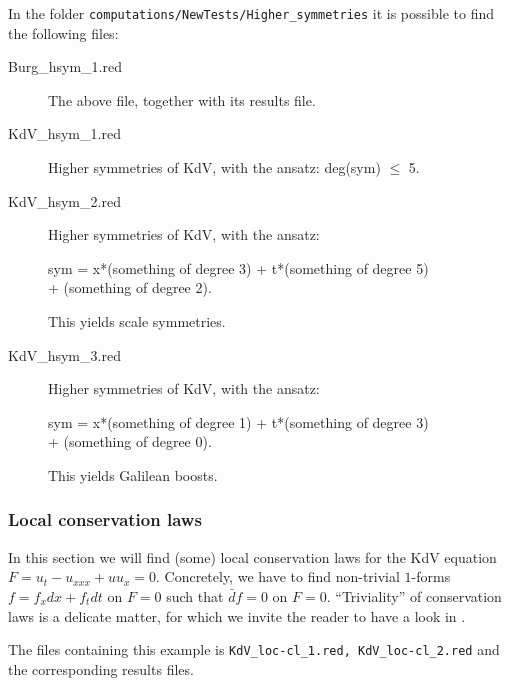 In the folder \texttt{computations/NewTests/Higher\_symmetries} it is possible
to find the following files:
\begin{description}
\item[Burg\_hsym\_1.red] The above file, together with its results file.
  \item[KdV\_hsym\_1.red] Higher symmetries of KdV, with the ansatz:
    deg(sym) $\leq$ 5.
\item[KdV\_hsym\_2.red] Higher symmetries of KdV, with the ansatz:
  \begin{center}
    sym = x*(something of degree 3) + t*(something of degree  5)\\
  + (something of degree 2).
  \end{center}
    This yields scale symmetries.
\item[KdV\_hsym\_3.red] Higher symmetries of KdV, with the ansatz:
  \begin{center}
    sym = x*(something of degree 1) + t*(something of degree 3)\\
    + (something of degree 0).
  \end{center}
This yields Galilean boosts.
\end{description}

\subsubsection{Local conservation laws}
\label{sec:local-cons-laws}

In this section we will find (some) local conservation laws for the KdV
equation $F=u_t-u_{xxx}+uu_x=0$. Concretely, we have to find non-trivial $1$-forms
$f=f_xdx+f_tdt$ on $F=0$ such that $\bar d f=0$ on $F=0$. ``Triviality'' of
conservation laws is a delicate matter, for which we invite the reader to have
a look in \cite{Many}.

The files containing this example is \texttt{KdV\_loc-cl\_1.red,
  KdV\_loc-cl\_2.red} and the corresponding results files.

